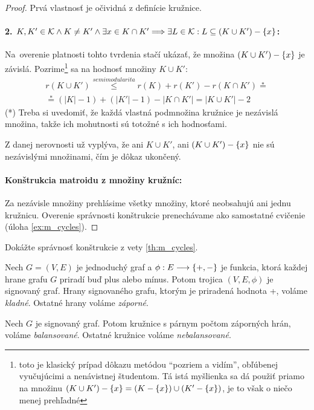 \begin{proof}
Prvá vlastnosť je očividná z definície kružnice.
\paragraph{2. $K, K' \in \mathcal{K} \wedge K \neq K' \wedge \exists x \in K \cap K' \Longrightarrow \exists L \in \mathcal{K}: L \subseteq (K \cup K') - \left\{x\right\}$:}
Na~overenie platnosti tohto tvrdenia stačí ukázať, že množina $(K \cup K') - \left\{x\right\}$ je závislá.
Pozrime\footnote{toto je klasický prípad dôkazu metódou ``pozriem a vidím'', obľúbenej vyučujúcimi a nenávistnej študentom. Tá istá myšlienka sa dá použiť priamo na množinu $(K \cup K') - \left\{x\right\} = (K - \left\{x\right\}) \cup (K' - \left\{x\right\})$, je to však o niečo menej prehľadné} sa na hodnosť množiny $K \cup K'$:
\begin{multline*}
r(K \cup K') \overset{semimodularita}{\leq} r(K) + r(K') - r(K \cap K')  \overset{*}{=} \\ \overset{*}{=}  (|K| - 1) + (|K'| - 1) - |K \cap K'| = |K \cup K'| - 2  
\end{multline*}
(*) Treba si uvedomiť, že každá vlastná podmnožina kružnice je nezávislá množina, takže ich mohutnosti sú totožné s ich hodnosťami. 

Z danej nerovnosti už vyplýva, že ani $K \cup K'$, ani $(K \cup K') - \left\{x\right\}$ nie sú nezávislými množinami, čím je dôkaz ukončený.
\paragraph{Konštrukcia matroidu z množiny kružníc:}
Za nezávisle množiny prehlásime všetky množiny, ktoré neobsahujú ani jednu kružnicu.
Overenie správnosti konštrukcie prenechávame ako samostatné cvičenie (úloha \ref{ex:m_cycles}).
\end{proof}
\begin{exercise}
\label{ex:m_cycles}
Dokážte správnosť konštrukcie z vety \ref{th:m_cycles}.
\end{exercise}

\begin{definition}
Nech $G = (V, E)$ je jednoduchý graf a $\phi:E\longrightarrow\left\{+, -\right\}$ je funkcia, ktorá každej hrane grafu $G$ priradí buď plus alebo mínus. 
Potom trojica $(V, E, \phi)$ je signovaný graf.
Hrany signovaného grafu, ktorým je priradená hodnota +, voláme \emph{kladné}.
Ostatné hrany voláme \emph{záporné}.
\end{definition}

\begin{definition}
Nech $G$ je signovaný graf.
Potom kružnice s párnym počtom záporných hrán, voláme \emph{balansované}. Ostatné kružnice voláme \emph{nebalansované}.
\end{definition}

